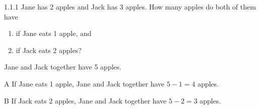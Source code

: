 \begin{problem}{1.1.1}
Jane has 2 apples and Jack has 3 apples. How many apples do both of them have
\begin{enumerate}
    \item if Jane eats 1 apple, and
    \item if Jack eats 2 apples?
\end{enumerate}
\end{problem}

\begin{solution}

Jane and Jack together have 5 apples.

\begin{solutionpart}{A}
If Jane eats 1 apple, Jane and Jack together have $5 - 1 = 4$ apples.
\end{solutionpart}

\begin{solutionpart}{B}
If Jack eats 2 apples, Jane and Jack together have $5 - 2 = 3$ apples.
\end{solutionpart}

\end{solution}